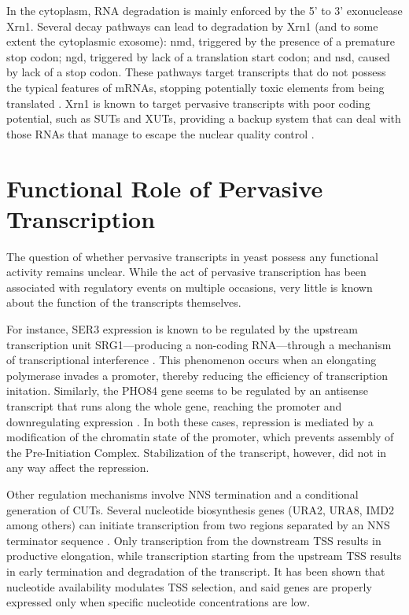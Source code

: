 In the cytoplasm, RNA degradation is mainly enforced by the 5' to 3' exonuclease Xrn1. 
Several decay pathways can lead to degradation by Xrn1 (and to some extent the cytoplasmic exosome): \gls{nmd}, triggered by the presence of a premature stop codon; \gls{ngd}, triggered by lack of a translation start codon; and \gls{nsd}, caused by lack of a stop codon.
These pathways target transcripts that do not possess the typical features of mRNAs, stopping potentially toxic elements from being translated \cite[for review see][]{houseley:2009:many}. 
Xrn1 is known to target pervasive transcripts with poor coding potential, such as SUTs and XUTs, providing a backup system that can deal with those RNAs that manage to escape the nuclear quality control \cite{malabat:2015:quality}.

\section{Functional Role of Pervasive Transcription}

The question of whether pervasive transcripts in yeast possess any functional activity remains unclear.
While the act of pervasive transcription has been associated with regulatory events on multiple occasions, very little is known about the function of the transcripts themselves. 

For instance, SER3 expression is known to be regulated by the upstream transcription unit SRG1—producing a non-coding RNA—through a mechanism of transcriptional interference \cite{martens:2004:intergenic}. 
This phenomenon occurs when an elongating polymerase invades a promoter, thereby reducing the efficiency of transcription initation. Similarly, the PHO84 gene seems to be regulated by an antisense transcript that runs along the whole gene, reaching the promoter and downregulating expression \cite{castelnuovo:2013:bimodal}. 
In both these cases, repression is mediated by a modification of the chromatin state of the promoter, which prevents assembly of the Pre-Initiation Complex. Stabilization of the transcript, however, did not in any way affect the repression.

Other regulation mechanisms involve NNS termination and a conditional generation of CUTs. Several nucleotide biosynthesis genes (URA2, URA8, IMD2 among others) can initiate transcription from two regions separated by an NNS terminator sequence \cite{jenks:2008:properties, thiebaut:2008:futile}. 
Only transcription from the downstream TSS results in productive elongation, while transcription starting from the upstream TSS results in early termination and degradation of the transcript. 
It has been shown that nucleotide availability modulates TSS selection, and said genes are properly expressed only when specific nucleotide concentrations are low.


\clearpage



